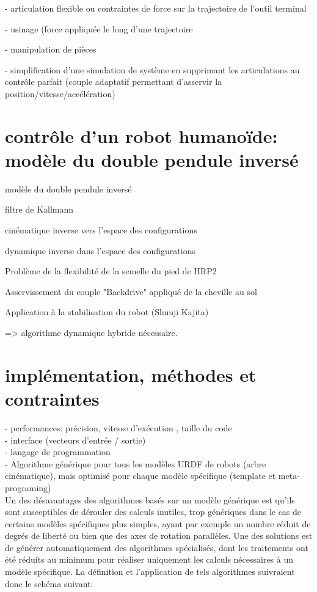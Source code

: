 \documentclass{report}
\begin{document}
	- articulation flexible	ou contraintes de force sur la trajectoire de l'outil terminal
	
	- usinage (force appliquée le long d'une trajectoire
	
	- manipulation de pièces
	
	- simplification d'une simulation de système en supprimant les articulations au contrôle parfait (couple adaptatif permettant d'asservir la position/vitesse/accélération)


\section{contrôle d'un robot humanoïde: modèle du double pendule inversé}

modèle du double pendule inversé

filtre de Kallmann

cinématique inverse vers l'espace des configurations

dynamique inverse dans l'espace des configurations

Problème de la flexibilité de la semelle du pied de HRP2

Asservissement du couple "Backdrive" appliqué de la cheville au sol

Application à la stabilisation du robot (Shuuji Kajita)

=> algorithme dynamique hybride nécessaire.

\section{implémentation, méthodes et contraintes} \label{ch_concepts_implEtContr}
- performances: précision, vitesse d'exécution , taille du code\\
- interface (vecteurs d'entrée / sortie)\\
- langage de programmation\\
- Algorithme générique pour tous les modèles URDF de robots (arbre cinématique), mais optimisé pour chaque modèle spécifique (template et meta-programing)\\

Un des désavantages des algorithmes basés sur un modèle générique est qu'ils sont susceptibles de dérouler des calculs inutiles, trop génériques dans le cas de certains modèles spécifiques plus simples, ayant par exemple un nombre réduit de degrés de liberté ou bien que des axes de rotation parallèles. Une des solutions est de générer automatiquement des algorithmes spécialisés, dont les traitements ont été réduits au minimum pour réaliser uniquement les calculs nécessaires à un modèle spécifique. La définition et l'application de tels algorithmes suivraient donc le schéma suivant:
\end{document}
